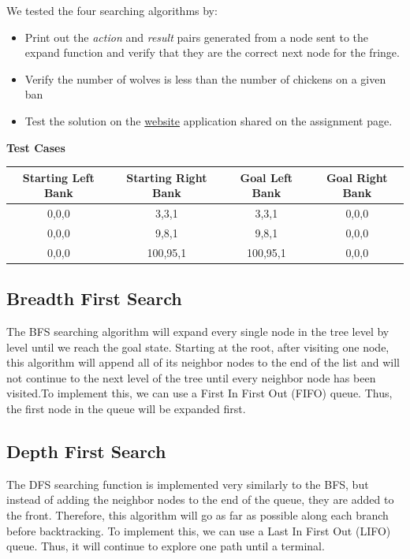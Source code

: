 \documentclass[onecolumn,draftclsnofoot, 10pt, compsoc]{IEEEtran}
\begin{document}
    We tested the four searching algorithms by:
	\begin{itemize}
		\item Print out the \textit{action} and \textit{result} pairs generated from a node sent to the expand function and verify that they are the correct next node for the fringe.
		
		\item Verify the number of wolves is less than the number of chickens on a given ban
		
		\item Test the solution on the \href{https://scratch.mit.edu/projects/55981236/} {website} application shared on the assignment page.
	\end{itemize}
	
	\begin{center}
	\textbf{Test Cases}
	
	\begin{tabular}{|c|c|c|c|}
		\hline
		\textbf{Starting Left Bank} & \textbf{Starting Right Bank} & \textbf{Goal Left Bank} & \textbf{Goal Right Bank} \\ \hline
		
		0,0,0 & 3,3,1 & 3,3,1 & 0,0,0 \\ \hline	
		0,0,0 & 9,8,1 & 9,8,1 & 0,0,0 \\ \hline
		0,0,0 & 100,95,1 & 100,95,1 & 0,0,0 \\ \hline
    \end{tabular}
    \end{center}
        
	\subsection{Breadth First Search}
	The BFS searching algorithm will expand every single node in the tree level by level until we reach the goal state. Starting at the root, after visiting one node, this algorithm will append all of its neighbor nodes to the end of the list and will not continue to the next level of the tree until every neighbor node has been visited.To implement this, we can use a First In First Out (FIFO) queue. Thus, the first node in the queue will be expanded first.
	

	\subsection{Depth First Search}
    The DFS searching function is implemented very similarly to the BFS, but instead of adding the neighbor nodes to the end of the queue, they are added to the front. Therefore, this algorithm will go as far as possible along each branch before backtracking. To implement this, we can use a Last In First Out (LIFO) queue. Thus, it will continue to explore one path until a terminal.
\end{document}
